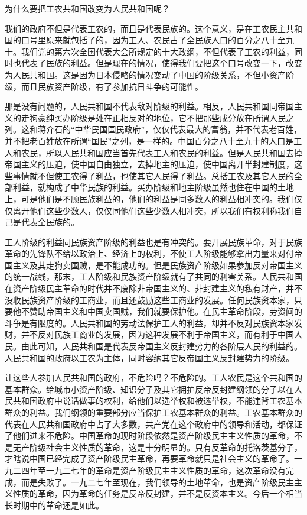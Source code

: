 为什么要把工农共和国改变为人民共和国呢？

我们的政府不但是代表工农的，而且是代表民族的。这个意义，是在工农民主共和国的口号里原来就包括了的，因为工人、农民占了全民族人口的百分之八十至九十。我们党的第六次全国代表大会所规定的十大政纲，不但代表了工农的利益，同时也代表了民族的利益。但是现在的情况，使得我们要把这个口号改变一下，改变为人民共和国。这是因为日本侵略的情况变动了中国的阶级关系，不但小资产阶级，而且民族资产阶级，有了参加抗日斗争的可能性。

那是没有问题的，人民共和国不代表敌对阶级的利益。相反，人民共和国同帝国主义的走狗豪绅买办阶级是处在正相反对的地位，它不把那些成分放在所谓人民之列。这和蒋介石的“中华民国国民政府”，仅仅代表最大的富翁，并不代表老百姓，并不把老百姓放在所谓“国民”之列，是一样的。中国百分之八十至九十的人口是工人和农民，所以人民共和国应当首先代表工人和农民的利益。但是人民共和国去掉帝国主义的压迫，使中国自由独立，去掉地主的压迫，使中国离开半封建制度，这些事情就不但使工农得了利益，也使其它人民得了利益。总括工农及其它人民的全部利益，就构成了中华民族的利益。买办阶级和地主阶级虽然也住在中国的土地上，可是他们是不顾民族利益的，他们的利益是同多数人的利益相冲突的。我们仅仅离开他们这些少数人，仅仅同他们这些少数人相冲突，所以我们有权利称我们自己是代表全民族的。

工人阶级的利益同民族资产阶级的利益也是有冲突的。要开展民族革命，对于民族革命的先锋队不给以政治上、经济上的权利，不使工人阶级能够拿出力量来对付帝国主义及其走狗卖国贼，是不能成功的。但是民族资产阶级如果参加反对帝国主义的统一战线，那末，工人阶级和民族资产阶级就有了共同的利害关系。人民共和国在资产阶级民主革命的时代并不废除非帝国主义的、非封建主义的私有财产，并不没收民族资产阶级的工商业，而且还鼓励这些工商业的发展。任何民族资本家，只要他不赞助帝国主义和中国卖国贼，我们就要保护他。在民主革命阶段，劳资间的斗争是有限度的。人民共和国的劳动法保护工人的利益，却并不反对民族资本家发财，并不反对民族工商业的发展，因为这种发展不利于帝国主义，而有利于中国人民。由此可知，人民共和国是代表反帝国主义反封建势力的各阶层人民的利益的。人民共和国的政府以工农为主体，同时容纳其它反帝国主义反封建势力的阶级。

让这些人参加人民共和国的政府，不危险吗？不危险的。工人农民是这个共和国的基本群众。给城市小资产阶级、知识分子及其它拥护反帝反封建纲领的分子以在人民共和国政府中说话做事的权利，给他们以选举权和被选举权，不能违背工农基本群众的利益。我们纲领的重要部分应当保护工农基本群众的利益。工农基本群众的代表在人民共和国政府中占了大多数，共产党在这个政府中的领导和活动，都保证了他们进来不危险。中国革命的现时阶段依然是资产阶级民主主义性质的革命，不是无产阶级社会主义性质的革命，这是十分明显的。只有反革命的托洛茨基分子，才瞎说中国已经完成了资产阶级民主革命，再要革命就只是社会主义的革命了。一九二四年至一九二七年的革命是资产阶级民主主义性质的革命，这次革命没有完成，而是失败了。一九二七年至现在，我们领导的土地革命，也是资产阶级民主主义性质的革命，因为革命的任务是反帝反封建，并不是反资本主义。今后一个相当长时期中的革命还是如此。

